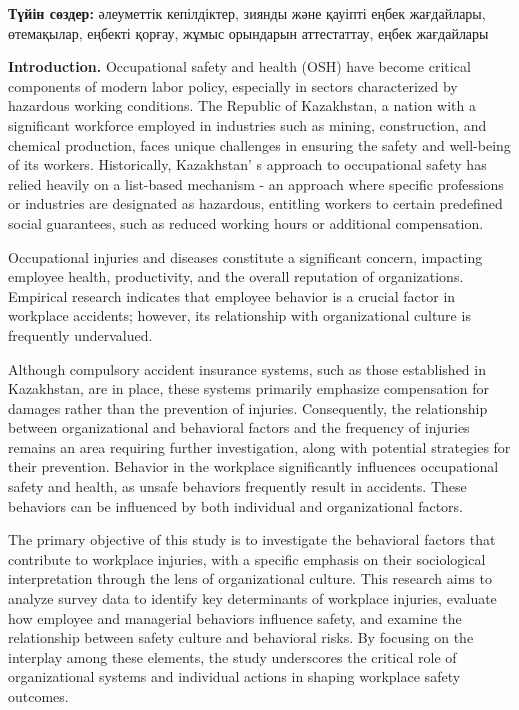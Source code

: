 {\bfseries Түйін сөздер:} әлеуметтік кепілдіктер, зиянды және қауіпті еңбек
жағдайлары, өтемақылар, еңбекті қорғау, жұмыс орындарын аттестаттау,
еңбек жағдайлары

\begin{multicols}{2}
{\bfseries Introduction.} Occupational safety and health (OSH) have become
critical components of modern labor policy, especially in sectors
characterized by hazardous working conditions. The Republic of
Kazakhstan, a nation with a significant workforce employed in industries
such as mining, construction, and chemical production, faces unique
challenges in ensuring the safety and well-being of its workers.
Historically, Kazakhstan' s approach to occupational
safety has relied heavily on a list-based mechanism - an approach where
specific professions or industries are designated as hazardous,
entitling workers to certain predefined social guarantees, such as
reduced working hours or additional compensation.

Occupational injuries and diseases constitute a significant concern,
impacting employee health, productivity, and the overall reputation of
organizations. Empirical research indicates that employee behavior is a
crucial factor in workplace accidents; however, its relationship with
organizational culture is frequently undervalued.

Although compulsory accident insurance systems, such as those
established in Kazakhstan, are in place, these systems primarily
emphasize compensation for damages rather than the prevention of
injuries. Consequently, the relationship between organizational and
behavioral factors and the frequency of injuries remains an area
requiring further investigation, along with potential strategies for
their prevention. Behavior in the workplace significantly influences
occupational safety and health, as unsafe behaviors frequently result in
accidents. These behaviors can be influenced by both individual and
organizational factors.

The primary objective of this study is to investigate the behavioral
factors that contribute to workplace injuries, with a specific emphasis
on their sociological interpretation through the lens of organizational
culture. This research aims to analyze survey data to identify key
determinants of workplace injuries, evaluate how employee and managerial
behaviors influence safety, and examine the relationship between safety
culture and behavioral risks. By focusing on the interplay among these
elements, the study underscores the critical role of organizational
systems and individual actions in shaping workplace safety outcomes.


\end{multicols}
